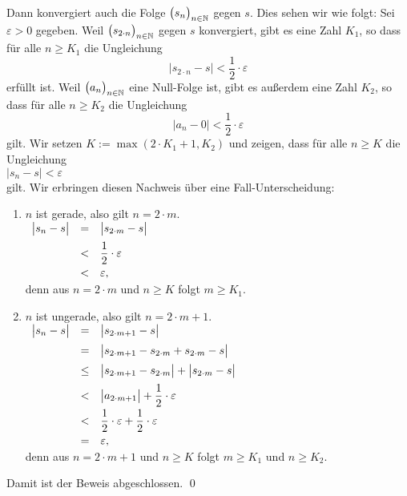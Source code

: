 Dann konvergiert auch die Folge $\bigl(s_{n}\bigr)_{n\in\mathbb{N}}$ gegen $s$. Dies sehen wir wie folgt:
Sei $\varepsilon > 0$ gegeben.  Weil   $\bigl(s_{2 \cdot n}\bigr)_{n\in\mathbb{N}}$ gegen $s$ konvergiert, gibt es eine
Zahl $K_1$, so dass f\"ur alle $n \geq K_1$ die Ungleichung
\begin{equation}
  \label{eq:seq2}
  \bigl| s_{2 \cdot n} - s \bigr| < \frac{1}{2}\cdot\varepsilon
\end{equation}
erf\"ullt ist.  Weil $\bigl(a_{n}\bigr)_{n\in\mathbb{N}}$ eine Null-Folge ist, gibt es au\ss{}erdem eine Zahl $K_2$,
so dass f\"ur alle $n \geq K_2$ die Ungleichung
\begin{equation}
  \label{eq:seq3}
  \bigl| a_n - 0 \bigr| < \frac{1}{2} \cdot \varepsilon
\end{equation}
gilt.  Wir setzen $K:= \max(2 \cdot K_1 + 1,K_2)$ und zeigen, dass f\"ur alle $n \geq K$ die Ungleichung
\\[0.2cm]
\hspace*{1.3cm}
$ \bigl| s_n - s \bigr| < \varepsilon $
\\[0.2cm]
gilt.  Wir erbringen diesen Nachweis \"uber eine Fall-Unterscheidung:
\begin{enumerate}
\item $n$ ist gerade, also gilt $n= 2 \cdot m$.
      \\[0.2cm]
\hspace*{1.3cm}
$ \begin{array}{lcl}
        \bigl| s_n - s \bigr| & = & \bigl| s_{2 \cdot m} - s \bigr| \\[0.2cm]
                              & < & \displaystyle\frac{1}{2}\cdot\varepsilon \\[0.2cm]
                              & < & \varepsilon,
         \end{array}
      $
\\[0.2cm]
      denn aus $n=2 \cdot m$ und $n \geq K$ folgt $m \geq K_1$.
\item $n$ ist ungerade, also gilt $n= 2 \cdot m+1$.
      \\[0.2cm]
\hspace*{1.3cm}
$ \begin{array}{lcl}
        \bigl| s_n - s \bigr| & = & \bigl| s_{2 \cdot m+1} - s \bigr| \\[0.2cm]
                              & = & \bigl| s_{2 \cdot m+1} - s_{2 \cdot m} + s_{2 \cdot m} - s \bigr| \\[0.2cm]
                              & \leq & \bigl| s_{2 \cdot m+1} - s_{2 \cdot m} \bigr| + \bigl| s_{2 \cdot m} - s \bigr| \\[0.2cm]
                              & < & \displaystyle\bigl| a_{2 \cdot m+1} \bigr| + \frac{1}{2}\cdot\varepsilon \\[0.2cm]
                              & < & \displaystyle\frac{1}{2}\cdot\varepsilon + \frac{1}{2}\cdot\varepsilon \\[0.2cm]
                              & = & \varepsilon,
         \end{array}
       $
\\[0.2cm]
       denn aus $n=2\cdot m+1$ und $n \geq K$ folgt $m \geq K_1$ und $n \geq K_2$.
\end{enumerate}
Damit ist der Beweis abgeschlossen. \qed 

